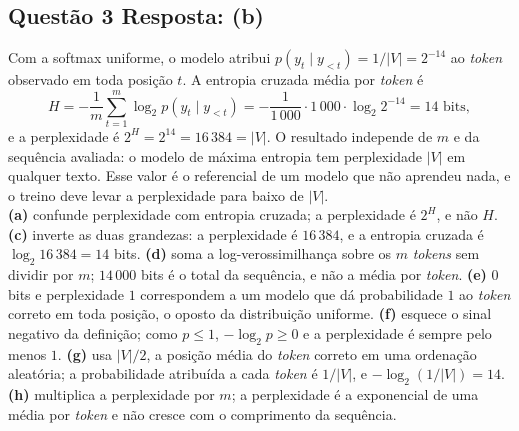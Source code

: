 \documentclass[11pt,a4paper]{article}
\begin{document}
\subsection*{Questão 3 \textemdash{} Resposta: (b)}
Com a softmax uniforme, o modelo atribui $p(y_t \mid y_{<t}) = 1/|V| = 2^{-14}$ ao \textit{token} observado em toda posição $t$. A entropia cruzada média por \textit{token} é
\[
H = -\frac{1}{m}\sum_{t=1}^{m} \log_2 p(y_t \mid y_{<t}) = -\frac{1}{1\,000}\cdot 1\,000 \cdot \log_2 2^{-14} = 14 \text{ bits},
\]
e a perplexidade é $2^{H} = 2^{14} = 16\,384 = |V|$. O resultado independe de $m$ e da sequência avaliada: o modelo de máxima entropia tem perplexidade $|V|$ em qualquer texto. Esse valor é o referencial de um modelo que não aprendeu nada, e o treino deve levar a perplexidade para baixo de $|V|$.\\
\textbf{(a)} confunde perplexidade com entropia cruzada; a perplexidade é $2^{H}$, e não $H$.
\textbf{(c)} inverte as duas grandezas: a perplexidade é $16\,384$, e a entropia cruzada é $\log_2 16\,384 = 14$ bits.
\textbf{(d)} soma a log-verossimilhança sobre os $m$ \textit{tokens} sem dividir por $m$; $14\,000$ bits é o total da sequência, e não a média por \textit{token}.
\textbf{(e)} $0$ bits e perplexidade $1$ correspondem a um modelo que dá probabilidade $1$ ao \textit{token} correto em toda posição, o oposto da distribuição uniforme.
\textbf{(f)} esquece o sinal negativo da definição; como $p \le 1$, $-\log_2 p \ge 0$ e a perplexidade é sempre pelo menos $1$.
\textbf{(g)} usa $|V|/2$, a posição média do \textit{token} correto em uma ordenação aleatória; a probabilidade atribuída a cada \textit{token} é $1/|V|$, e $-\log_2(1/|V|) = 14$.
\textbf{(h)} multiplica a perplexidade por $m$; a perplexidade é a exponencial de uma média por \textit{token} e não cresce com o comprimento da sequência.
\end{document}
